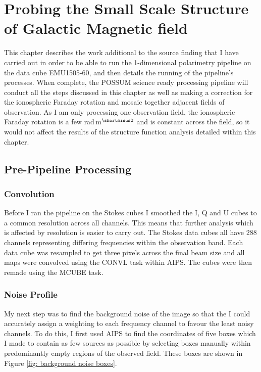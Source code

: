 \chapter{Probing the Small Scale Structure of Galactic Magnetic field}
\label{ch: RMsynth}

This chapter describes the work additional to the source finding that I have carried out in order to be able to run the 1-dimensional polarimetry pipeline on the data cube EMU1505-60, and then details the running of the pipeline's processes. When complete, the POSSUM science ready processing pipeline will conduct all the steps discussed in this chapter as well as making a correction for the ionospheric Faraday rotation and mosaic together adjacent fields of observation. As I am only processing one observation field, the ionospheric Faraday rotation is a few rad$\,$m$^{\shortminus2}$ and is constant across the field, so it would not affect the results of the structure function analysis detailed within this chapter. 

\section{Pre-Pipeline Processing}

\subsection{Convolution}

Before I ran the pipeline on the Stokes cubes I smoothed the I, Q and U cubes to a common resolution across all channels. This means that further analysis which is affected by resolution is easier to carry out. The Stokes data cubes all have 288 channels representing differing frequencies within the observation band. Each data cube was resampled to get three pixels across the final beam size and all maps were convolved using the CONVL task within AIPS. The cubes were then remade using the MCUBE task.

\subsection{Noise Profile}

My next step was to find the background noise of the image so that the I could accurately assign a weighting to each frequency channel to favour the least noisy channels. To do this, I first used AIPS to find the coordinates of five boxes which I made to contain as few sources as possible by selecting boxes manually within predominantly empty regions of the observed field. These boxes are shown in Figure \ref{fig: background noise boxes}.

